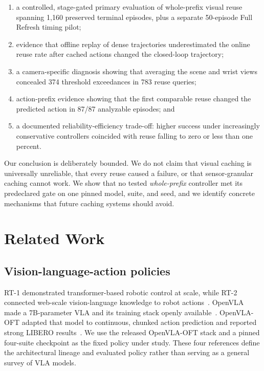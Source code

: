 \documentclass[11pt]{article}
\begin{document}
\begin{enumerate}
    \item a controlled, stage-gated primary evaluation of whole-prefix visual reuse spanning 1,160 preserved terminal episodes, plus a separate 50-episode Full Refresh timing pilot;
    \item evidence that offline replay of dense trajectories underestimated the online reuse rate after cached actions changed the closed-loop trajectory;
    \item a camera-specific diagnosis showing that averaging the scene and wrist views concealed 374 threshold exceedances in 783 reuse queries;
    \item action-prefix evidence showing that the first comparable reuse changed the predicted action in 87/87 analyzable episodes; and
    \item a documented reliability-efficiency trade-off: higher success under increasingly conservative controllers coincided with reuse falling to zero or less than one percent.
\end{enumerate}

Our conclusion is deliberately bounded. We do not claim that visual caching is universally unreliable, that every reuse caused a failure, or that sensor-granular caching cannot work. We show that no tested \emph{whole-prefix} controller met its predeclared gate on one pinned model, suite, and seed, and we identify concrete mechanisms that future caching systems should avoid.

\section{Related Work}

\subsection{Vision-language-action policies}

RT-1 demonstrated transformer-based robotic control at scale, while RT-2 connected web-scale vision-language knowledge to robot actions~\cite{rt1,rt2}. OpenVLA made a 7B-parameter VLA and its training stack openly available~\cite{openvla}. OpenVLA-OFT adapted that model to continuous, chunked action prediction and reported strong LIBERO results~\cite{openvlaoft}. We use the released OpenVLA-OFT stack and a pinned four-suite checkpoint as the fixed policy under study. These four references define the architectural lineage and evaluated policy rather than serving as a general survey of VLA models.
\end{document}
